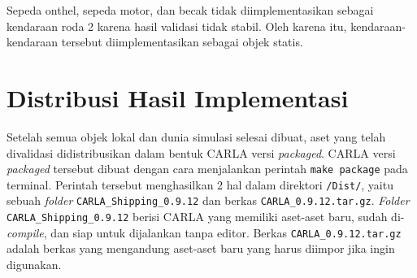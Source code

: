 Sepeda onthel, sepeda motor, dan becak tidak diimplementasikan sebagai kendaraan
roda 2 karena hasil validasi tidak stabil. Oleh karena itu, kendaraan-kendaraan
tersebut diimplementasikan sebagai objek statis.

\section{Distribusi Hasil Implementasi}

Setelah semua objek lokal dan dunia simulasi selesai dibuat, aset yang
telah divalidasi didistribusikan dalam bentuk CARLA versi \textit{packaged}.
CARLA versi \textit{packaged} tersebut dibuat dengan cara menjalankan perintah
\verb|make package| pada terminal. Perintah tersebut menghasilkan 2 hal dalam
direktori \verb|/Dist/|, yaitu sebuah \textit{folder}
\verb|CARLA_Shipping_0.9.12| dan berkas \verb|CARLA_0.9.12.tar.gz|.
\textit{Folder} \verb|CARLA_Shipping_0.9.12| berisi CARLA yang memiliki
aset-aset baru, sudah di-\textit{compile}, dan siap untuk dijalankan tanpa
editor. Berkas \verb|CARLA_0.9.12.tar.gz| adalah berkas yang mengandung
aset-aset baru yang harus diimpor jika ingin digunakan.
